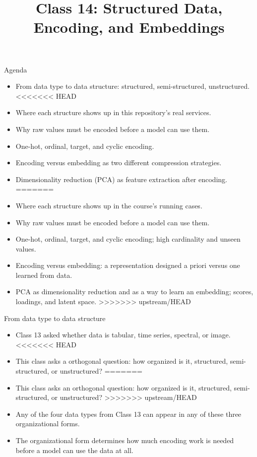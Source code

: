 
\usepackage{amssymb}
\usetikzlibrary{decorations.pathreplacing}

\title{Class 14: Structured Data, Encoding, and Embeddings}
\author{\coursename}
\date{}



\frame{\titlepage \coursefooter}

\begin{frame}{Agenda}
\begin{itemize}
\item From data type to data structure: structured, semi-structured, unstructured.
<<<<<<< HEAD
\item Where each structure shows up in this repository's real services.
\item Why raw values must be encoded before a model can use them.
\item One-hot, ordinal, target, and cyclic encoding.
\item Encoding versus embedding as two different compression strategies.
\item Dimensionality reduction (PCA) as feature extraction after encoding.
=======
\item Where each structure shows up in the course's running cases.
\item Why raw values must be encoded before a model can use them.
\item One-hot, ordinal, target, and cyclic encoding; high cardinality and unseen values.
\item Encoding versus embedding: a representation designed a priori versus one learned from data.
\item PCA as dimensionality reduction and as a way to learn an embedding; scores, loadings, and latent space.
>>>>>>> upstream/HEAD
\end{itemize}
\coursefooter
\end{frame}

\begin{frame}{From data type to data structure}
\begin{itemize}
\item Class 13 asked whether data is tabular, time series, spectral, or image.
<<<<<<< HEAD
\item This class asks a orthogonal question: how organized is it, structured, semi-structured, or unstructured?
=======
\item This class asks an orthogonal question: how organized is it, structured, semi-structured, or unstructured?
>>>>>>> upstream/HEAD
\item Any of the four data types from Class 13 can appear in any of these three organizational forms.
\item The organizational form determines how much encoding work is needed before a model can use the data at all.
\end{itemize}
\coursefooter
\end{frame}

